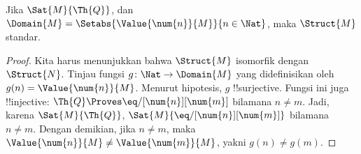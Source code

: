 \documentclass[../../../include/open-logic-section]{subfiles}
\begin{document}
\begin{prop}
Jika $\Sat{M}{\Th{Q}}$, dan $\Domain{M} =
\Setabs{\Value{\num{n}}{M}}{n \in \Nat}$, maka $\Struct{M}$ standar.
\end{prop}

\begin{proof}
Kita harus menunjukkan bahwa $\Struct{M}$ isomorfik dengan~$\Struct{N}$.
Tinjau fungsi $g\colon \Nat \to \Domain{M}$ yang didefinisikan oleh
$g(n) = \Value{\num{n}}{M}$. Menurut hipotesis, $g$ !!{surjective}. Fungsi
ini juga !!{injective}: $\Th{Q} \Proves \eq/[\num{n}][\num{m}]$ bilamana
$n \neq m$. Jadi, karena $\Sat{M}{\Th{Q}}$,
$\Sat{M}{\eq/[\num{n}][\num{m}]}$ bilamana $n \neq m$. Dengan demikian,
jika $n \neq m$, maka $\Value{\num{n}}{M} \neq \Value{\num{m}}{M}$, yakni
$g(n) \neq g(m)$.


\end{proof}
\end{document}
